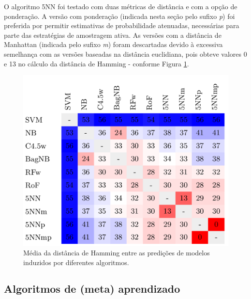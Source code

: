 O algoritmo 5NN foi testado com duas métricas de distância e com a opção de ponderação.
A versão com ponderação (indicada nesta seção pelo sufixo \textit{p}) foi preferida por permitir estimativas de probabilidade atenuadas, necessárias para parte das estratégias de amostragem ativa.
As versões com a distância de Manhattan (indicada pelo sufixo \textit{m}) foram descartadas devido à excessiva semelhança com as versões baseadas na distância euclidiana, pois obteve valores 0 e 13 no cálculo da distância de Hamming - conforme Figura \ref{leasimis}.
\begin{figure}
  \setlength{\unitlength}{1.0cm}
  \centering
    \includegraphics[scale=0.45]{images/heatmap-final-leas.pdf}
  \caption[Média da distância de Hamming entre predições de modelos induzidos]{Média da distância de Hamming entre as predições de modelos induzidos por diferentes algoritmos.}
  \label{leasimis}
\end{figure}



\subsection{Algoritmos de (meta) aprendizado}\label{algmeta}

